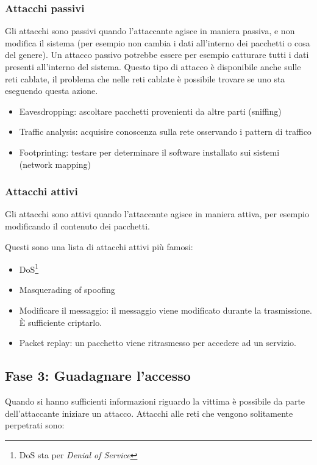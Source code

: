 \subsubsection{Attacchi passivi}

Gli attacchi sono passivi quando l'attaccante agisce in maniera passiva, e non 
modifica il sistema (per esempio non cambia i dati all'interno dei pacchetti o 
cosa del genere). Un attacco passivo potrebbe essere per esempio catturare 
tutti i dati presenti all'interno del sistema. Questo tipo di attacco è 
disponibile anche sulle reti cablate, il problema che nelle reti cablate è 
possibile trovare se uno sta eseguendo questa azione.

\begin{itemize}
\item Eavesdropping: ascoltare pacchetti provenienti da altre parti (sniffing)
\item Traffic analysis: acquisire conoscenza sulla rete osservando i pattern di 
traffico
\item Footprinting: testare per determinare il software installato sui sistemi 
(network mapping)
\end{itemize}

\subsubsection{Attacchi attivi}

Gli attacchi sono attivi quando l'attaccante agisce in maniera attiva, per 
esempio modificando il contenuto dei pacchetti.

Questi sono una lista di attacchi attivi più famosi:
\begin{itemize}
\item DoS\footnote{DoS sta per \textit{Denial of Service}}
\item Masquerading of spoofing
\item Modificare il messaggio: il messaggio viene modificato durante la 
trasmissione. È sufficiente criptarlo.
\item Packet replay: un pacchetto viene ritrasmesso per accedere ad un servizio.
\end{itemize}

\subsection{Fase 3: Guadagnare l'accesso}

Quando si hanno sufficienti informazioni riguardo la vittima è possibile da 
parte dell'attaccante iniziare un attacco.
Attacchi alle reti che vengono solitamente perpetrati sono:

